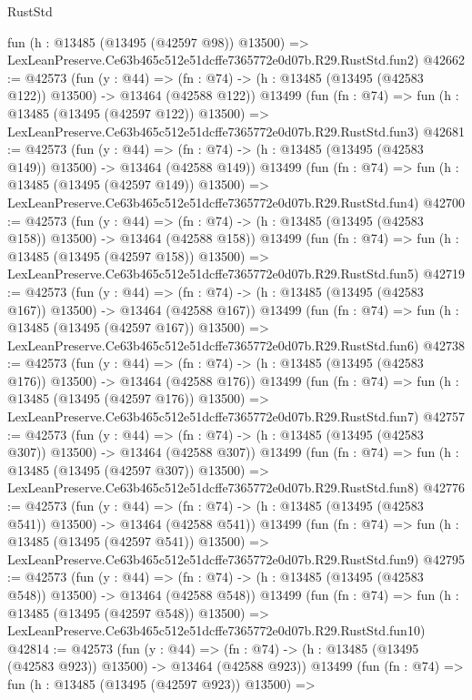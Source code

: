 \begin{lexlean}{RustStd}
\begin{coremodule}
    fun (h : @13485 (@13495 (@42597 @98)) @13500) =>
    LexLeanPreserve.Ce63b465c512e51dcffe7365772e0d07b.R29.RustStd.fun2)
@42662 := @42573
    (fun (y : @44) =>
    (fn : @74) -> (h : @13485 (@13495 (@42583 @122)) @13500) -> @13464 (@42588 @122))
    @13499
    (fun (fn : @74) =>
    fun (h : @13485 (@13495 (@42597 @122)) @13500) =>
    LexLeanPreserve.Ce63b465c512e51dcffe7365772e0d07b.R29.RustStd.fun3)
@42681 := @42573
    (fun (y : @44) =>
    (fn : @74) -> (h : @13485 (@13495 (@42583 @149)) @13500) -> @13464 (@42588 @149))
    @13499
    (fun (fn : @74) =>
    fun (h : @13485 (@13495 (@42597 @149)) @13500) =>
    LexLeanPreserve.Ce63b465c512e51dcffe7365772e0d07b.R29.RustStd.fun4)
@42700 := @42573
    (fun (y : @44) =>
    (fn : @74) -> (h : @13485 (@13495 (@42583 @158)) @13500) -> @13464 (@42588 @158))
    @13499
    (fun (fn : @74) =>
    fun (h : @13485 (@13495 (@42597 @158)) @13500) =>
    LexLeanPreserve.Ce63b465c512e51dcffe7365772e0d07b.R29.RustStd.fun5)
@42719 := @42573
    (fun (y : @44) =>
    (fn : @74) -> (h : @13485 (@13495 (@42583 @167)) @13500) -> @13464 (@42588 @167))
    @13499
    (fun (fn : @74) =>
    fun (h : @13485 (@13495 (@42597 @167)) @13500) =>
    LexLeanPreserve.Ce63b465c512e51dcffe7365772e0d07b.R29.RustStd.fun6)
@42738 := @42573
    (fun (y : @44) =>
    (fn : @74) -> (h : @13485 (@13495 (@42583 @176)) @13500) -> @13464 (@42588 @176))
    @13499
    (fun (fn : @74) =>
    fun (h : @13485 (@13495 (@42597 @176)) @13500) =>
    LexLeanPreserve.Ce63b465c512e51dcffe7365772e0d07b.R29.RustStd.fun7)
@42757 := @42573
    (fun (y : @44) =>
    (fn : @74) -> (h : @13485 (@13495 (@42583 @307)) @13500) -> @13464 (@42588 @307))
    @13499
    (fun (fn : @74) =>
    fun (h : @13485 (@13495 (@42597 @307)) @13500) =>
    LexLeanPreserve.Ce63b465c512e51dcffe7365772e0d07b.R29.RustStd.fun8)
@42776 := @42573
    (fun (y : @44) =>
    (fn : @74) -> (h : @13485 (@13495 (@42583 @541)) @13500) -> @13464 (@42588 @541))
    @13499
    (fun (fn : @74) =>
    fun (h : @13485 (@13495 (@42597 @541)) @13500) =>
    LexLeanPreserve.Ce63b465c512e51dcffe7365772e0d07b.R29.RustStd.fun9)
@42795 := @42573
    (fun (y : @44) =>
    (fn : @74) -> (h : @13485 (@13495 (@42583 @548)) @13500) -> @13464 (@42588 @548))
    @13499
    (fun (fn : @74) =>
    fun (h : @13485 (@13495 (@42597 @548)) @13500) =>
    LexLeanPreserve.Ce63b465c512e51dcffe7365772e0d07b.R29.RustStd.fun10)
@42814 := @42573
    (fun (y : @44) =>
    (fn : @74) -> (h : @13485 (@13495 (@42583 @923)) @13500) -> @13464 (@42588 @923))
    @13499
    (fun (fn : @74) =>
    fun (h : @13485 (@13495 (@42597 @923)) @13500) =>

\end{coremodule}
\end{lexlean}
